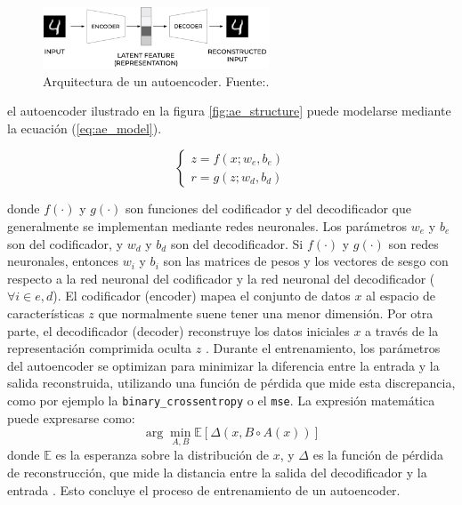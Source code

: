 \begin{figure}[h]
    \centering
    \includegraphics[width=0.6\textwidth]{img/AE4.png}
    \caption{Arquitectura de un autoencoder. Fuente:\citep{autoencoderImage}.}
    \label{fig:AE_architecture}
\end{figure}




el autoencoder ilustrado en la figura \ref{fig:ae_structure} puede modelarse mediante la ecuación (\ref{eq:ae_model}).

\begin{equation}
\begin{cases}
z = f(x; w_e, b_e) \\
r = g(z; w_d, b_d)
\end{cases}
\label{eq:ae_model}
\end{equation}

donde $f(\cdot)$ y $g(\cdot)$ son funciones del codificador y del decodificador que generalmente se implementan mediante redes neuronales. Los parámetros $w_e$ y $b_e$ son del codificador, y $w_d$ y $b_d$ son del decodificador. Si $f(\cdot)$ y $g(\cdot)$ son redes neuronales, entonces $w_i$ y $b_i$ son las matrices de pesos y los vectores de sesgo con respecto a la red neuronal del codificador y la red neuronal del decodificador ($ \forall i \in  {e, d}$). El codificador (encoder) mapea el conjunto de datos $x$  al espacio de características $z$ que normalmente suene tener una menor dimensión. Por otra parte, el decodificador (decoder) reconstruye los datos iniciales $x$ a través de la representación comprimida oculta $z$ \citep{zhai2018autoencoder}. Durante el entrenamiento, los parámetros del autoencoder se optimizan para minimizar la diferencia entre la entrada y la salida reconstruida, utilizando una función de pérdida que mide esta discrepancia, como por ejemplo la \lstinline|binary_crossentropy| o el \lstinline|mse|. La expresión matemática puede expresarse como:
\begin{equation}
\arg \min_{A, B} \mathbb{E}[\Delta(x, B \circ A(x))]
\end{equation}
donde $\mathbb{E}$ es la esperanza sobre la distribución de $x$, y $\Delta$ es la función de pérdida de reconstrucción, que mide la distancia entre la salida del decodificador y la entrada \citep{bank2023autoencoders}. Esto concluye el proceso de entrenamiento de un autoencoder.


